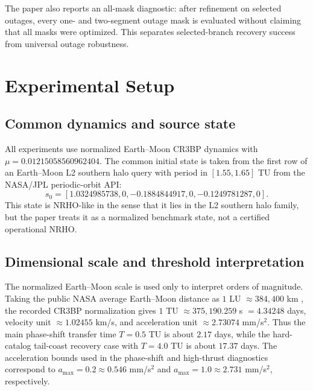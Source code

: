 \documentclass[preprint,12pt]{elsarticle}
\begin{document}
The paper also reports an all-mask diagnostic: after refinement on selected outages, every one- and two-segment outage mask is evaluated without claiming that all masks were optimized. This separates selected-branch recovery success from universal outage robustness.

\section{Experimental Setup}

\subsection{Common dynamics and source state}

All experiments use normalized Earth--Moon CR3BP dynamics with $\mu=0.01215058560962404$. The common initial state is taken from the first row of an Earth--Moon L2 southern halo query with period in $[1.55,1.65]$ TU from the NASA/JPL periodic-orbit API:
\begin{equation}
s_0=[1.0324985738,0,-0.1884844917,0,-0.1249781287,0].
\end{equation}
This state is NRHO-like in the sense that it lies in the L2 southern halo family, but the paper treats it as a normalized benchmark state, not a certified operational NRHO.

\subsection{Dimensional scale and threshold interpretation}
\label{sec:dimensional-scale}

The normalized Earth--Moon scale is used only to interpret orders of magnitude. Taking the public NASA average Earth--Moon distance as $1$ LU $\approx 384{,}400$ km \cite{nasaSpacePlaceMoonDistance}, the recorded CR3BP normalization gives $1$ TU $\approx 375{,}190.259$ s $=4.34248$ days, velocity unit $\approx 1.02455$ km/s, and acceleration unit $\approx 2.73074$ mm/s$^2$. Thus the main phase-shift transfer time $T=0.5$ TU is about $2.17$ days, while the hard-catalog tail-coast recovery case with $T=4.0$ TU is about $17.37$ days. The acceleration bounds used in the phase-shift and high-thrust diagnostics correspond to $a_{\max}=0.2\approx 0.546$ mm/s$^2$ and $a_{\max}=1.0\approx 2.731$ mm/s$^2$, respectively.
\end{document}
